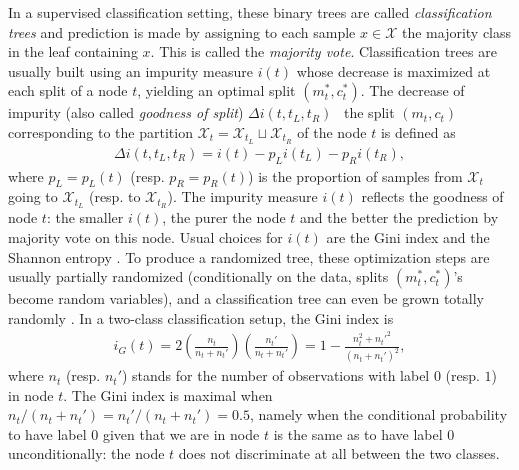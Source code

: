 In a supervised classification setting, these binary trees are called \emph{classification trees} and
prediction is made by assigning to each sample $x \in \mathcal{X}$ the majority class in the leaf containing $x$. This is called the \emph{majority vote}.
Classification trees are usually built using an impurity measure $i(t)$ whose decrease is maximized at each split of a node $t$, yielding an optimal split $(m_t^*, c_t^*)$. The decrease of impurity (also called \emph{goodness of split}) $\Delta i(t, t_L, t_R)$ \wrt~the split $(m_t, c_t)$ corresponding to the partition $\mathcal{X}_t=\mathcal{X}_{t_L}\sqcup \mathcal{X}_{t_R}$ of the node $t$ is defined as
\begin{align}
\label{ocrf:eq:impurity_measure_decrease}
\Delta i(t, t_L, t_R) = i(t) - p_L i(t_L) - p_R i(t_R),
\end{align}
where $p_L = p_L(t)$ (resp. $p_R = p_R(t)$) is the proportion of samples from $\mathcal{X}_t$ going to $\mathcal{X}_{t_L}$ (resp. to $\mathcal{X}_{t_R}$). The impurity measure $i(t)$ reflects the goodness of node $t$: the smaller $i(t)$, the purer the node $t$ and the better the prediction by majority vote on this node. Usual choices for $i(t)$ are the Gini index \citep{Gini1912} and the Shannon entropy \citep{Shannon2001}.
To produce a randomized tree, these optimization steps are usually partially randomized (conditionally on the data, splits $(m_t^*, c_t^*)$'s become random variables), and a classification tree can even be grown totally randomly \citep{Geurts2006}.
%
In a two-class classification setup, the Gini index is
\begin{align}
\label{ocrf:eq:gini}
  i_G(t) = 2\left(\frac{n_t}{n_t + n_t'}\right) \left( \frac{n_t'}{n_t + n_t'}\right) = 1 - \frac{n_t^2 + n_t'^2}{(n_t + n_t')^2},
\end{align}
where $n_t$ (resp. $n_t'$) stands for the number of observations with label $0$ (resp. $1$) in node $t$. The Gini index is maximal when $n_t/(n_t + n_t') = n_t'/(n_t + n_t')=0.5$, namely when the conditional probability to have label $0$ given that we are in node $t$ is the same as to have label $0$ unconditionally: the node $t$ does not discriminate at all between the two classes. %

